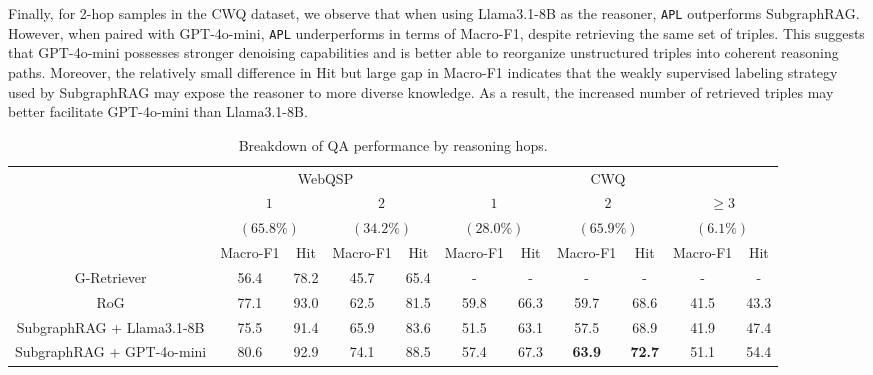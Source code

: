 \documentclass{article}
\theoremstyle{plain}
\theoremstyle{definition}
\theoremstyle{remark}
\newcommand{\tb}[1]{\textbf{#1}}
\newcommand{\proj}{\texttt{\scalebox{1.03}{R}APL}}
\begin{document}
 Finally, for 2-hop samples in the CWQ dataset, we observe that when using Llama3.1-8B as the reasoner, \proj{} outperforms SubgraphRAG. However, when paired with GPT-4o-mini, \proj{} underperforms in terms of Macro-F1, despite retrieving the same set of triples. This suggests that GPT-4o-mini possesses stronger denoising capabilities and is better able to reorganize unstructured triples into coherent reasoning paths. Moreover, the relatively small difference in Hit but large gap in Macro-F1 indicates that the weakly supervised labeling strategy used by SubgraphRAG may expose the reasoner to more diverse knowledge. As a result, the increased number of retrieved triples may better facilitate GPT-4o-mini than Llama3.1-8B.
\begin{table}[!t]
    \caption{Breakdown of QA performance by reasoning hops.}
    \label{tab:acc_hop}
    \centering
    \begin{adjustbox}{width=0.9\textwidth}
        \begin{tabular}{ccccccccccc}
            \toprule
             & \multicolumn{4}{c}{WebQSP} & \multicolumn{6}{c}{CWQ}\\
            \cmidrule(lr){2-5} \cmidrule(lr){6-11}
              & \multicolumn{2}{c}{$1$}  
              & \multicolumn{2}{c}{$2$}  
              & \multicolumn{2}{c}{$1$}  
              & \multicolumn{2}{c}{$2$} 
              & \multicolumn{2}{c}{$\geq 3$}  \\
              & \multicolumn{2}{c}{$(65.8 \%)$}  
              & \multicolumn{2}{c}{$(34.2 \%)$} 
              & \multicolumn{2}{c}{$(28.0 \%)$}  
              & \multicolumn{2}{c}{$(65.9 \%)$}  
              & \multicolumn{2}{c}{$(6.1 \%)$}  \\
            \cmidrule(lr){2-3} \cmidrule(lr){4-5} \cmidrule(lr){6-7} \cmidrule(lr){8-9} \cmidrule(lr){10-11} 
             & Macro-F1 & Hit & Macro-F1 & Hit & Macro-F1 & Hit & Macro-F1 & Hit & Macro-F1 & Hit \\
            \midrule
            G-Retriever 
            & 56.4 & 78.2 & 45.7 & 65.4 & - & - & - & - & - & - \\
            RoG
            & 77.1 & 93.0 & 62.5 & 81.5 & 59.8 & 66.3 & 59.7 & 68.6 & 41.5 & 43.3 \\
            SubgraphRAG + Llama3.1-8B
            & 75.5 & 91.4 & 65.9 & 83.6 & 51.5 & 63.1 & 57.5 & 68.9 & 41.9 & 47.4 \\
            SubgraphRAG + GPT-4o-mini 
            & 80.6 & 92.9 & 74.1 & 88.5 & 57.4 & 67.3 & \tb{63.9} & \tb{72.7} & 51.1 & 54.4 \\

\end{tabular}
\end{adjustbox}
\end{table}
\end{document}
